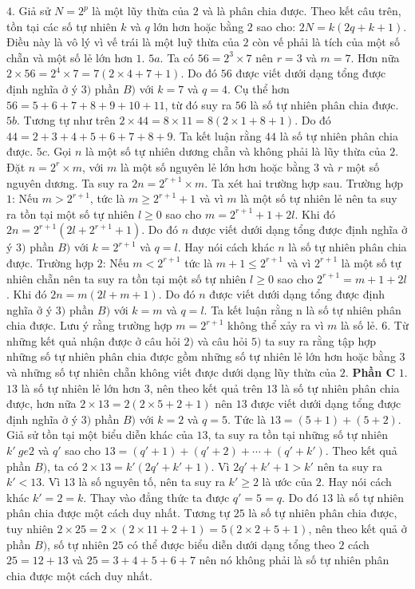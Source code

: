 \begin{multicols}{2}
\vskip 0.05cm
$4.$ Giả sử $N=2^p$ là một lũy thừa của $2$ và là phân chia được. Theo kết câu trên, tồn tại các số tự nhiên $k$ và $q$ lớn hơn hoặc bằng $2$ sao cho: $2N=k(2q+k+1)$. Điều này là vô lý vì vế trái là một luỹ thừa của $2$ còn vế phải là tích của một số chẵn và một số lẻ lớn hơn $1$. 
\vskip 0.05cm
$5a.$ Ta có $56=2^3\times7$ nên $r=3$ và $m=7$. Hơn nữa $2\times 56=2^4\times7=7(2\times4+7+1)$. Do đó $56$ được viết dưới dạng tổng được định nghĩa ở ý $3)$ phần $B)$ với $k=7$ và $q=4$. Cụ thể hơn $56=5+6+7+8+9+10+11$, từ đó suy ra $56$ là số tự nhiên phân chia được. 
\vskip 0.05cm
$5b.$ Tương tự như trên $2\times 44=8\times11=8(2\times1+8+1)$. Do đó $44=2+3+4+5+6+7+8+9$. Ta kết luận rằng $44$ là số tự nhiên phân chia được.
\vskip 0.05cm 
$5c.$ Gọi $n$ là một số tự nhiên dương chẵn và không phải là lũy thừa của $2$. Đặt $n=2^r\times m$, với $m$ là một số nguyên lẻ lớn hơn hoặc bằng $3$ và $r$ một số nguyên dương. Ta suy ra $2n=2^{r+1}\times m$. Ta xét hai trường hợp sau. 
\vskip 0.05cm
Trường hợp $1$: Nếu $m>2^{r+1}$, tức là $m \ge 2^{r+1}+1$ và vì $m$ là một số tự nhiên lẻ nên ta suy ra tồn tại một số tự nhiên $l\ge 0$ sao cho $m=2^{r+1}+1+2l$. Khi đó $2n=2^{r+1}(2l+2^{r+1}+1)$. Do đó $n$ được viết dưới dạng tổng được định nghĩa ở ý $3)$ phần $B)$ với $k=2^{r+1}$ và $q=l$. Hay nói cách khác $n$ là số tự nhiên phân chia được. 
\vskip 0.05cm
Trường hợp $2$: Nếu $m<2^{r+1}$ tức là $m+1 \le 2^{r+1}$ và vì $2^{r+1}$ là một số tự nhiên chẵn nên ta suy ra tồn tại một số tự nhiên $l \ge 0$ sao cho $2^{r+1}=m+1+2l$. Khi đó $2n=m(2l+m+1)$. Do đó $n$ được viết dưới dạng tổng được định nghĩa ở ý $3)$ phần $B)$ với $k=m$ và $q=l$. Ta kết luận rằng n là số tự nhiên phân chia được.  
\vskip 0.05cm
Lưu ý rằng trường hợp $m=2^{r+1}$ không thể xảy ra vì $m$ là số lẻ. 
\vskip 0.05cm
$6.$ Từ những kết quả nhận được ở câu hỏi $2)$ và câu hỏi $5)$ ta suy ra rằng tập hợp những số tự nhiên phân chia được gồm những số tự nhiên lẻ lớn hơn hoặc bằng $3$ và những số tự nhiên chẵn không  viết được dưới dạng lũy thừa của $2$. 
\vskip 0.05cm
\textbf{\color{cackithi}Phần C}
\vskip 0.05cm
$1.$ $13$ là số tự nhiên lẻ lớn hơn $3$, nên theo kết quả trên $13$ là số tự nhiên phân chia được, hơn nữa $2\times 13=2(2\times 5+2+1)$ nên $13$ được viết dưới dạng tổng được định nghĩa ở ý $3)$ phần $B)$ với $k=2$ và $q=5$. Tức là $13=(5+1)+(5+2)$. Giả sử tồn tại một biểu diễn khác của $13$, ta suy ra tồn tại những số tự nhiên $k'\ ge 2$ và $q'$ sao cho $13=(q'+1)+(q'+2)+\cdots+(q'+k')$. Theo kết quả phần $B)$, ta có $2\times 13=k'(2q'+k'+1)$. Vì $2q'+k'+1>k'$ nên ta suy ra $k'<13$. Vì $13$ là số nguyên tố, nên ta suy ra $k'\ge 2$ là ước của $2$. Hay nói cách khác $k'=2=k$. Thay vào đẳng thức ta được $q'=5=q$. Do đó $13$ là số tự nhiên phân chia được một cách duy nhất. Tương tự $25$ là số tự nhiên phân chia được, tuy nhiên $2\times25=2\times(2\times11+2+1)=5(2\times2+5+1)$, nên theo kết quả ở phần $B)$, số tự nhiên $25$ có thể được biểu diễn dưới dạng tổng theo $2$ cách $25=12+13$ và $25=3+4+5+6+7$ nên nó không phải là số tự nhiên phân chia được một cách duy nhất.

\end{multicols}
